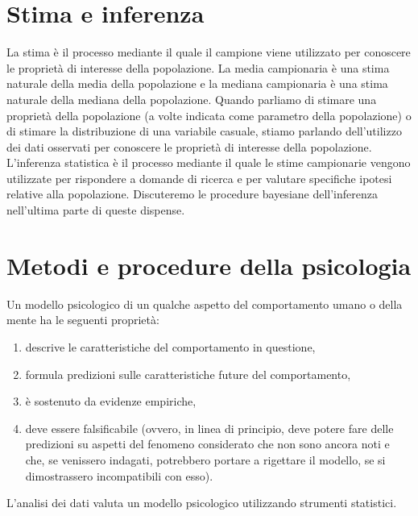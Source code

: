 \documentclass[
  11pt,
]{krantz}
\providecommand{\tightlist}{%
  \setlength{\itemsep}{0pt}\setlength{\parskip}{0pt}}
\theoremstyle{definition}
\theoremstyle{definition}
\theoremstyle{definition}
\theoremstyle{definition}
\theoremstyle{remark}
\begin{document}
\hypertarget{stima-e-inferenza}{%
\section{Stima e inferenza}\label{stima-e-inferenza}}

La stima è il processo mediante il quale il campione viene utilizzato per conoscere le proprietà di interesse della popolazione. La media campionaria è una stima naturale della media della popolazione e la mediana campionaria è una stima naturale della mediana della popolazione. Quando parliamo di stimare una proprietà della popolazione (a volte indicata come parametro della popolazione) o di stimare la distribuzione di una variabile casuale, stiamo parlando dell'utilizzo dei dati osservati per conoscere le proprietà di interesse della popolazione. L'inferenza statistica è il processo mediante il quale le stime campionarie vengono utilizzate per rispondere a domande di ricerca e per valutare specifiche ipotesi relative alla popolazione. Discuteremo le procedure bayesiane dell'inferenza nell'ultima parte di queste dispense.

\hypertarget{metodi-e-procedure-della-psicologia}{%
\section{Metodi e procedure della psicologia}\label{metodi-e-procedure-della-psicologia}}

Un modello psicologico di un qualche aspetto del comportamento umano o della mente ha le seguenti proprietà:

\begin{enumerate}
\def\labelenumi{\arabic{enumi}.}
\tightlist
\item
  descrive le caratteristiche del comportamento in questione,
\item
  formula predizioni sulle caratteristiche future del comportamento,
\item
  è sostenuto da evidenze empiriche,
\item
  deve essere falsificabile (ovvero, in linea di principio, deve potere fare delle predizioni su aspetti del fenomeno considerato che non sono ancora noti e che, se venissero indagati, potrebbero portare a rigettare il modello, se si dimostrassero incompatibili con esso).
\end{enumerate}

\noindent L'analisi dei dati valuta un modello psicologico utilizzando strumenti statistici.
\end{document}
